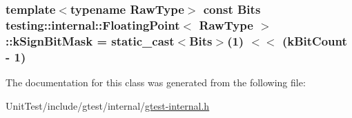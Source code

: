 \hypertarget{classtesting_1_1internal_1_1_floating_point_aca98b5ea6f2222a66a82e52421682efa}{
\subsubsection[{k\+Sign\+Bit\+Mask}]{\setlength{\rightskip}{0pt plus 5cm}template$<$typename Raw\+Type$>$ const {\bf Bits} {\bf testing\+::internal\+::\+Floating\+Point}$<$ Raw\+Type $>$\+::k\+Sign\+Bit\+Mask = static\+\_\+cast$<${\bf Bits}$>$(1) $<$$<$ ({\bf k\+Bit\+Count} -\/ 1)\hspace{0.3cm}{\ttfamily [static]}}}\label{classtesting_1_1internal_1_1_floating_point_aca98b5ea6f2222a66a82e52421682efa}


The documentation for this class was generated from the following file\+:\begin{DoxyCompactItemize}
\item 
Unit\+Test/include/gtest/internal/\hyperlink{gtest-internal_8h}{gtest-\/internal.\+h}\end{DoxyCompactItemize}
